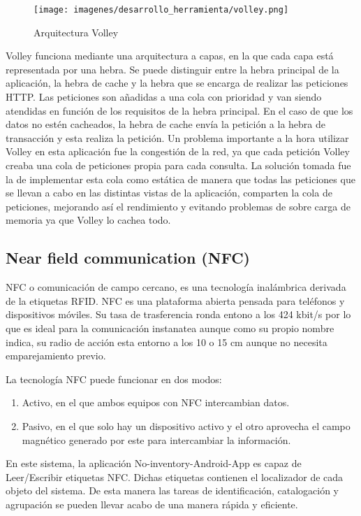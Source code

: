 \documentclass[a4paper,11pt]{book}
\begin{document}
\begin{figure}[H] 
\centering 
\texttt{[image: imagenes/desarrollo\_herramienta/volley.png]}
\caption{ Arquitectura Volley\cite{volley2}}
\end{figure}

Volley funciona mediante una arquitectura a capas, en la que cada capa está representada por una hebra. Se puede distinguir entre la hebra principal de la aplicación, la hebra de cache y la hebra que se encarga de realizar las peticiones HTTP.  Las peticiones son añadidas a una cola con prioridad y van siendo atendidas en función de los requisitos de la hebra principal. En el caso de que los datos no estén cacheados, la hebra de cache envía la petición a la hebra de transacción y esta realiza la petición. Un problema importante a la hora utilizar Volley en esta aplicación fue la congestión de la red, ya que cada petición Volley creaba una cola de peticiones propia para cada consulta. La solución tomada fue la de implementar esta cola como estática de manera que todas las peticiones que se llevan a cabo en las distintas vistas de la aplicación, comparten la cola de peticiones, mejorando así el rendimiento y evitando problemas de sobre carga de memoria ya que Volley lo cachea todo. 


\subsection{Near field communication (NFC)}
NFC\cite{nfc} o comunicación de campo cercano, es una tecnología inalámbrica derivada de la etiquetas RFID. NFC es una plataforma abierta pensada para teléfonos  y dispositivos móviles. Su tasa de trasferencia ronda entono a los  424 kbit/s por lo que es ideal para la comunicación instanatea aunque como su propio nombre indica, su radio de acción esta entorno a los 10 o 15 cm aunque no necesita emparejamiento previo. 

La tecnología NFC puede funcionar en dos modos:

\begin{enumerate}
\item Activo, en el que ambos equipos con NFC intercambian datos. 
\item Pasivo, en el que solo hay un dispositivo activo y el otro aprovecha el campo magnético generado por este para intercambiar la información.
\end{enumerate}

En este sistema, la aplicación No-inventory-Android-App es capaz de Leer/Escribir etiquetas NFC. Dichas etiquetas contienen el localizador de cada objeto del sistema. De esta manera las tareas de identificación, catalogación y agrupación  se pueden llevar acabo de una manera rápida y eficiente.
\end{document}
